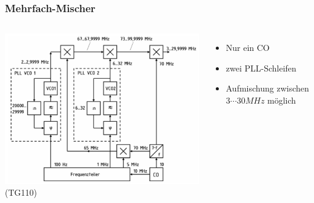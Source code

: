 \begin{frame}
    \frametitle{Mehrfach-Mischer}


    \begin{columns}[c]
        \includegraphics[width=\textwidth,height=.85\textheight,keepaspectratio]{a13/TG110.png}
    {\tiny (TG110)}
    \begin{itemize}
      \item Nur ein CO
      \item zwei PLL-Schleifen
      \item Aufmischung zwischen $3\cdots30MHz$ möglich
    \end{itemize}
  \end{columns}
\end{frame}

